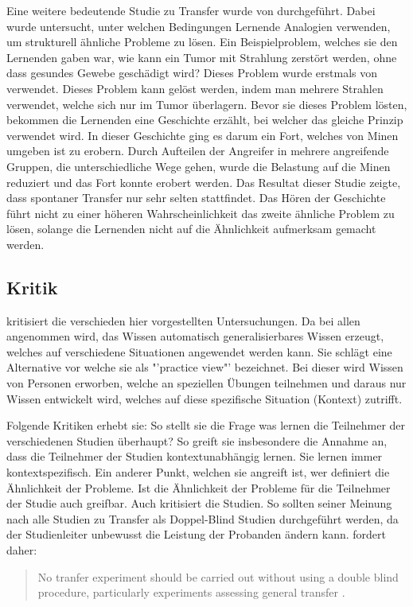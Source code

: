 Eine weitere bedeutende Studie zu Transfer wurde von \citet{Gick1980} durchgeführt. Dabei wurde untersucht, unter welchen Bedingungen Lernende Analogien verwenden, um strukturell ähnliche Probleme zu lösen. Ein Beispielproblem, welches sie den Lernenden gaben war, wie kann ein Tumor mit Strahlung zerstört werden, ohne dass gesundes Gewebe geschädigt wird? Dieses Problem wurde erstmals von \citet{Duncker1945} verwendet. Dieses Problem kann gelöst werden, indem man mehrere Strahlen verwendet, welche sich nur im Tumor überlagern. Bevor sie dieses Problem lösten, bekommen die Lernenden eine Geschichte erzählt, bei welcher das gleiche Prinzip verwendet wird. In dieser Geschichte ging es darum ein Fort, welches von Minen umgeben ist zu erobern. Durch Aufteilen der Angreifer in mehrere angreifende Gruppen, die unterschiedliche Wege gehen, wurde die Belastung auf die Minen reduziert und das Fort konnte erobert werden. Das Resultat dieser Studie zeigte, dass spontaner Transfer nur sehr selten stattfindet. Das Hören der Geschichte führt nicht zu einer höheren Wahrscheinlichkeit das zweite ähnliche Problem zu lösen, solange die Lernenden nicht auf die Ähnlichkeit aufmerksam gemacht werden.

\subsection{Kritik}

\citet{Lave1988} kritisiert die verschieden hier vorgestellten Untersuchungen. Da bei allen angenommen wird, das  Wissen automatisch generalisierbares Wissen erzeugt, welches auf verschiedene Situationen angewendet werden kann. Sie schlägt eine Alternative vor welche sie als "'practice view"' bezeichnet. Bei dieser wird Wissen von Personen erworben, welche an speziellen Übungen teilnehmen und daraus nur Wissen entwickelt wird, welches auf diese spezifische Situation (Kontext) zutrifft.

Folgende Kritiken erhebt sie: So stellt sie die Frage was lernen die Teilnehmer der verschiedenen Studien überhaupt? So greift sie insbesondere die Annahme an, dass die Teilnehmer der Studien kontextunabhängig lernen. Sie lernen immer kontextspezifisch. Ein anderer Punkt, welchen sie angreift ist, wer definiert die Ähnlichkeit der Probleme. Ist die Ähnlichkeit der Probleme für die Teilnehmer der Studie auch greifbar. Auch \citet{Detterman1993} kritisiert die Studien. So sollten seiner Meinung nach alle Studien zu Transfer als Doppel-Blind Studien durchgeführt werden, da der Studienleiter unbewusst die Leistung der Probanden ändern kann. \citeauthor{Detterman1993} fordert daher:
\begin{quote}
No tranfer experiment should be carried out without using a double blind procedure, particularly experiments assessing general transfer \citep[S. 10]{Detterman1993}.
\end{quote}





